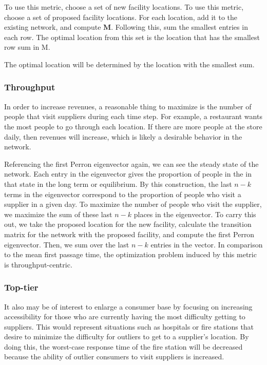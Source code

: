 \documentclass[twoside,twocolumn]{article}
\begin{document}
To use this metric, choose a set of new facility locations. 
To use this metric, choose a set of proposed facility locations.
For each location, add it to the existing network, and compute $\textbf{M}$.
Following this, sum the smallest entries in each row.
The optimal location from this set is the location that has the smallest row sum in M.

The optimal location will be determined by the location with the smallest sum.

\subsubsection{Throughput}

In order to increase revenues, a reasonable thing to maximize is the number of people that visit suppliers during each time step.
For example, a restaurant wants the most people to go through each location.
If there are more people at the store daily, then revenues will increase, which is likely a desirable behavior in the network.


Referencing the first Perron eigenvector again, we can see the steady state of the network. 
Each entry in the eigenvector gives the proportion of people in the in that state in the long term or equilibrium. 
By this construction, the last $n - k$ terms in the eigenvector correspond to the proportion of people who visit a supplier in a given day.
To maximize the number of people who visit the supplier, we maximize the sum of these last $n - k$ places in the eigenvector.
To carry this out, we take the proposed location for the new facility, calculate the transition matrix for the network with the proposed facility, and compute the first Perron eigenvector.
Then, we sum over the last $n - k$ entries in the vector.
In comparison to the mean first passage time, the optimization problem induced by this metric is throughput-centric.

\subsubsection{Top-tier}
It also may be of interest to enlarge a consumer base by focusing on increasing accessibility for those who are currently having the most difficulty getting to suppliers.
This would represent situations such as hospitals or fire stations that desire to minimize the difficulty for outliers to get to a supplier's location.
By doing this, the worst-case response time of the fire station will be decreased because the ability of outlier consumers to visit suppliers is increased.
\end{document}
